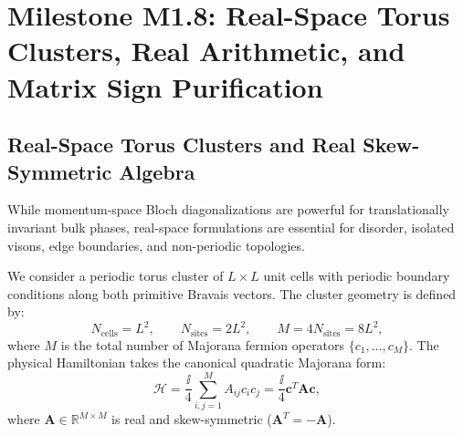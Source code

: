 \chapter{Milestone M1.8: Real-Space Torus Clusters, Real Arithmetic, and Matrix Sign Purification}
\label{ch:m1_8_real_space}

\section{Real-Space Torus Clusters and Real Skew-Symmetric Algebra}
\label{sec:m1_8_real_space_algebra}

While momentum-space Bloch diagonalizations are powerful for translationally invariant bulk phases, real-space formulations are essential for disorder, isolated visons, edge boundaries, and non-periodic topologies.

We consider a periodic torus cluster of $L \times L$ unit cells with periodic boundary conditions along both primitive Bravais vectors. The cluster geometry is defined by:
\begin{equation}
\label{eq:m1_8_cluster_dimensions}
N_{\mathrm{cells}} = L^2, \qquad N_{\mathrm{sites}} = 2 L^2, \qquad M = 4 N_{\mathrm{sites}} = 8 L^2,
\end{equation}
where $M$ is the total number of Majorana fermion operators $\{c_1, \dots, c_M\}$. The physical Hamiltonian takes the canonical quadratic Majorana form:
\begin{equation}
\label{eq:m1_8_majorana_hamiltonian}
\mathcal{H} = \frac{\ii}{4} \sum_{i, j = 1}^M A_{ij} c_i c_j = \frac{\ii}{4} \mathbf{c}^T \mathbf{A} \mathbf{c},
\end{equation}
where $\mathbf{A} \in \mathbb{R}^{M \times M}$ is real and skew-symmetric ($\mathbf{A}^T = -\mathbf{A}$).

